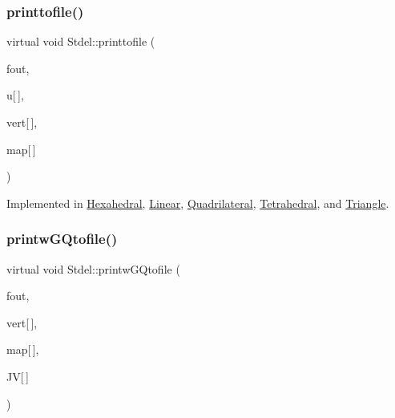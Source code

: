 \subsubsection{\texorpdfstring{printtofile()}{printtofile()}\hspace{0.1cm}{\footnotesize\ttfamily [2/2]}}
{\footnotesize\ttfamily virtual void Stdel\+::printtofile (\begin{DoxyParamCaption}\item[{F\+I\+LE $\ast$}]{fout,  }\item[{const double}]{u\mbox{[}$\,$\mbox{]},  }\item[{const \hyperlink{structVertice}{Vertice}}]{vert\mbox{[}$\,$\mbox{]},  }\item[{const int}]{map\mbox{[}$\,$\mbox{]} }\end{DoxyParamCaption})\hspace{0.3cm}{\ttfamily [pure virtual]}}



Implemented in \hyperlink{classHexahedral_a50af1e899b7b2642cbe7a2291e949ad3}{Hexahedral}, \hyperlink{classLinear_a8d3d30b9a1367f2cc154b79905554dd7}{Linear}, \hyperlink{classQuadrilateral_a45573246616ded9a71b895de3969c20d}{Quadrilateral}, \hyperlink{classTetrahedral_a615fe4c0df26ac87f46640c82fbe12b6}{Tetrahedral}, and \hyperlink{classTriangle_ab95679ba1b3e20ac9e585ffe409f7972}{Triangle}.

\mbox{\label{classStdel_aec7751f7873772d930c91cf93ec6b07b}} 
\subsubsection{\texorpdfstring{printw\+G\+Qtofile()}{printwGQtofile()}}
{\footnotesize\ttfamily virtual void Stdel\+::printw\+G\+Qtofile (\begin{DoxyParamCaption}\item[{F\+I\+LE $\ast$}]{fout,  }\item[{const \hyperlink{structVertice}{Vertice}}]{vert\mbox{[}$\,$\mbox{]},  }\item[{const int}]{map\mbox{[}$\,$\mbox{]},  }\item[{const double}]{JV\mbox{[}$\,$\mbox{]} }\end{DoxyParamCaption})\hspace{0.3cm}{\ttfamily [pure virtual]}}



